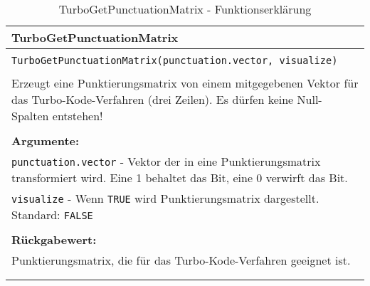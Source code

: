 \begin{longtable}{|p{\textwidth}|}
\hline
\rowcolor{lightblue}TurboGetPunctuationMatrix\\
\hline
\\
\texttt{TurboGetPunctuationMatrix(punctuation.vector, visualize)}\\
\\
Erzeugt eine Punktierungsmatrix von einem mitgegebenen Vektor für das Turbo-Kode-Verfahren (drei Zeilen). Es dürfen keine Null-Spalten entstehen!\\
\\
\textbf{Argumente:}\\
\texttt{punctuation.vector} - Vektor der in eine Punktierungsmatrix transformiert wird. Eine 1 behaltet das Bit, eine 0 verwirft das Bit.\\
\texttt{visualize} - Wenn \texttt{TRUE} wird Punktierungsmatrix dargestellt. Standard: \texttt{FALSE}\\
\\
\textbf{Rückgabewert:}\\
Punktierungsmatrix, die für das Turbo-Kode-Verfahren geeignet ist.\\
\\
\hline
\caption[TurboGetPunctuationMatrix]{TurboGetPunctuationMatrix - Funktionserklärung}
\end{longtable}